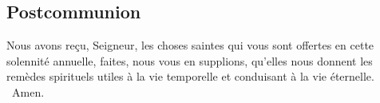 \begin{multicols}{2}
\subsection*{Postcommunion}
Nous avons reçu, Seigneur, les choses saintes qui vous sont offertes en cette solennité annuelle, faites, nous vous en supplions, qu’elles nous donnent les remèdes spirituels utiles à la vie temporelle et conduisant à la vie éternelle.
{\textbf \rb\ Amen.}
\end{multicols}